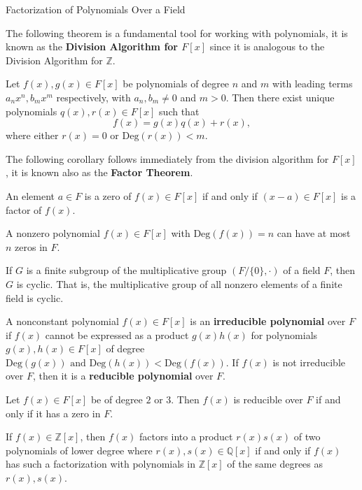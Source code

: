 \begin{section}{Factorization of Polynomials Over a Field}

The following theorem is a fundamental tool for working with polynomials, it is known as the {\bf Division Algorithm for $F[x]$} since it is analogous to the Division Algorithm for $\mathbb{Z}$.

\begin{thm}
Let $f(x),g(x) \in F[x]$ be polynomials of degree $n$ and $m$ with leading terms $a_{n}x^{n}, b_{m}x^{m}$ respectively, with $a_{n}, b_{m} \neq 0$ and $m > 0$. Then there exist unique polynomials $q(x),r(x) \in F[x]$ such that $$f(x) = g(x)q(x) + r(x),$$ where either $r(x) = 0$ or $\textrm{Deg}(r(x)) < m$.
\end{thm} 

The following corollary follows immediately from the division algorithm for $F[x]$, it is known also as the {\bf Factor Theorem}. 

\begin{cor}
An element $a \in F$ is a zero of $f(x) \in F[x]$ if and only if $(x-a) \in F[x]$ is a factor of $f(x)$.
\end{cor}

\begin{cor}
A nonzero polynomial $f(x) \in F[x]$ with $\textrm{Deg}(f(x)) = n$ can have at most $n$ zeros in $F$.
\end{cor}

\begin{cor}
If $G$ is a finite subgroup of the multiplicative group $(F/\{0\},\cdot)$ of a field $F$, then $G$ is cyclic. That is, the multiplicative group of all nonzero elements of a finite field is cyclic.
\end{cor}

\begin{defn}
A nonconstant polynomial $f(x) \in F[x]$ is an {\bf irreducible polynomial} over $F$ if $f(x)$ cannot be expressed as a product $g(x)h(x)$ for polynomials $g(x),h(x) \in F[x]$ of degree $\textrm{Deg}(g(x)) \textrm{ and } \textrm{Deg}(h(x)) < \textrm{Deg}(f(x))$. If $f(x)$ is not irreducible over $F$, then it is a {\bf reducible polynomial} over $F$.
\end{defn}

\begin{thm}
Let $f(x) \in F[x]$ be of degree $2$ or $3$. Then $f(x)$ is reducible over $F$ if and only if it has a zero in $F$.
\end{thm}

\begin{thm}
If $f(x) \in \mathbb{Z}[x]$, then $f(x)$ factors into a product $r(x)s(x)$ of two polynomials of lower degree where $r(x),s(x) \in \mathbb{Q}[x]$ if and only if $f(x)$ has such a factorization with polynomials in $\mathbb{Z}[x]$ of the same degrees as $r(x),s(x)$. 
\end{thm}


\end{section}
